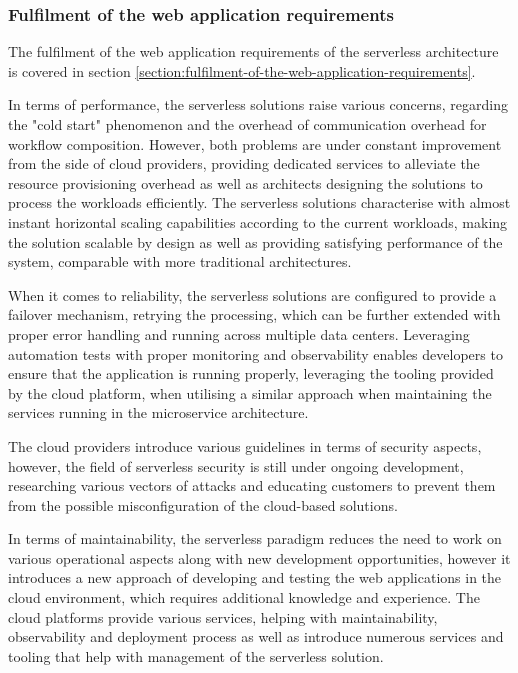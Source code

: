 \subsubsection{Fulfilment of the web application requirements}

The fulfilment of the web application requirements of the serverless architecture is covered in section \ref{section:fulfilment-of-the-web-application-requirements}.

In terms of performance, the serverless solutions raise various concerns, regarding the "cold start" phenomenon and the overhead of communication overhead for workflow composition. However, both problems are under constant improvement from the side of cloud providers, providing dedicated services to alleviate the resource provisioning overhead as well as architects designing the solutions to process the workloads efficiently.
The serverless solutions characterise with almost instant horizontal scaling capabilities according to the current workloads, making the solution scalable by design as well as providing satisfying performance of the system, comparable with more traditional architectures.

When it comes to reliability, the serverless solutions are configured to provide a failover mechanism, retrying the processing, which can be further extended with proper error handling and running across multiple data centers.
Leveraging automation tests with proper monitoring and observability enables developers to ensure that the application is running properly, leveraging the tooling provided by the cloud platform, when utilising a similar approach when maintaining the services running in the microservice architecture.

The cloud providers introduce various guidelines in terms of security aspects, however, the field of serverless security is still under ongoing development, researching various vectors of attacks and educating customers to prevent them from the possible misconfiguration of the cloud-based solutions.

In terms of maintainability, the serverless paradigm reduces the need to work on various operational aspects along with new development opportunities, however it introduces a new approach of developing and testing the web applications in the cloud environment, which requires additional knowledge and experience.
The cloud platforms provide various services, helping with maintainability, observability and deployment process as well as introduce numerous services and tooling that help with management of the serverless solution.

